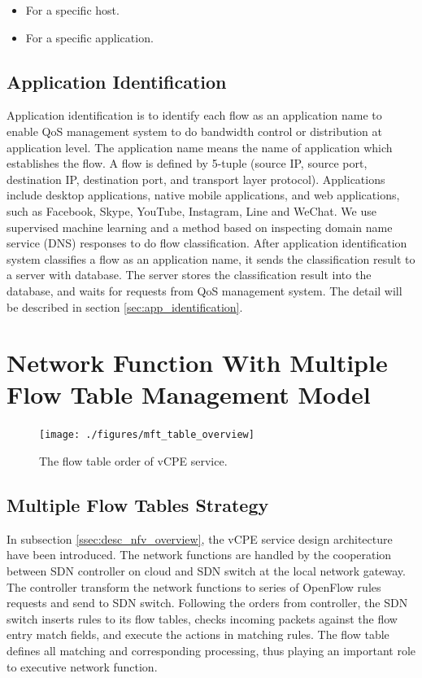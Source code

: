 \documentclass[journal]{IEEEtran}
\begin{document}
\begin{itemize}[]
\item For a specific host.
\item For a specific application.
\end{itemize}



\subsection{Application Identification}
Application identification is to identify each flow as an application name to enable QoS management system
to do bandwidth control or distribution at application level\cite{dynamic-qos-umeida}\cite{network-slicing-asia-pacific}.
The application name means the name of application which establishes the flow.
A flow is defined by 5-tuple (source IP, source port, destination IP, destination port, and transport layer protocol).
Applications include desktop applications, native mobile applications,
and web applications, such as Facebook, Skype, YouTube, Instagram, Line and WeChat.
We use supervised machine learning and a method based on inspecting domain name service (DNS)
responses to do flow classification.
After application identification system classifies a flow as an application name,
it sends the classification result to a server with database.
The server stores the classification result into the database, and waits for requests from QoS management system.
The detail will be described in section \ref{sec:app_identification}.




\section{Network Function With Multiple Flow Table Management Model} \label{sec:mft}

\begin{figure}[!t]
\centering
\texttt{[image: ./figures/mft\_table\_overview]}
\caption{The flow table order of vCPE service.}
\label{fig:mft_table_overview}
\end{figure}

\subsection{Multiple Flow Tables Strategy}
In subsection \ref{ssec:desc_nfv_overview}, the vCPE service design architecture have been introduced. The network functions are handled by the cooperation between SDN controller on cloud and SDN switch at the local network gateway. The controller transform the network functions to series of OpenFlow rules requests and send to SDN switch. Following the orders from controller, the SDN switch inserts rules to its flow tables, checks incoming packets against the flow entry match fields, and execute the actions in matching rules. The flow table\cite{sdn-ft} defines all matching and corresponding processing, thus playing an important role to executive network function.
\end{document}
